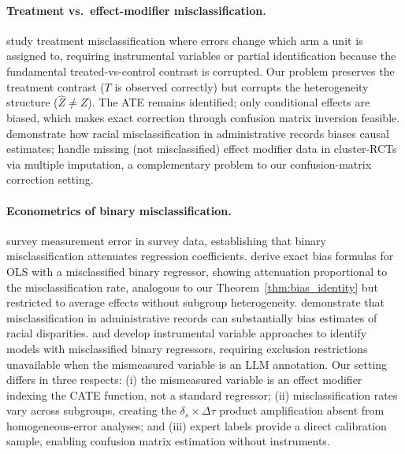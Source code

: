 \paragraph{Treatment vs.\ effect-modifier misclassification.}
\citet{imai2010causal} study treatment misclassification where errors change which arm a unit is assigned to, requiring instrumental variables or partial identification because the fundamental treated-vs-control contrast is corrupted.
Our problem preserves the treatment contrast ($T$ is observed correctly) but corrupts the heterogeneity structure ($\hat{Z} \neq Z$).
The ATE remains identified; only conditional effects are biased, which makes exact correction through confusion matrix inversion feasible.
\citet{knox2020administrative} demonstrate how racial misclassification in administrative records biases causal estimates; \citet{blette2024assessing} handle missing (not misclassified) effect modifier data in cluster-RCTs via multiple imputation, a complementary problem to our confusion-matrix correction setting.

\paragraph{Econometrics of binary misclassification.}
\citet{bound2001measurement} survey measurement error in survey data, establishing that binary misclassification attenuates regression coefficients.
\citet{frazis2003estimating} derive exact bias formulas for OLS with a misclassified binary regressor, showing attenuation proportional to the misclassification rate, analogous to our Theorem~\ref{thm:bias_identity} but restricted to average effects without subgroup heterogeneity.
\citet{knox2020administrative} demonstrate that misclassification in administrative records can substantially bias estimates of racial disparities.
\citet{mahajan2006identification} and \citet{lewbel2007estimation} develop instrumental variable approaches to identify models with misclassified binary regressors, requiring exclusion restrictions unavailable when the mismeasured variable is an LLM annotation.
Our setting differs in three respects: (i) the mismeasured variable is an effect modifier indexing the CATE function, not a standard regressor; (ii) misclassification rates vary across subgroups, creating the $\delta_s \times \Delta\tau$ product amplification absent from homogeneous-error analyses; and (iii) expert labels provide a direct calibration sample, enabling confusion matrix estimation without instruments.


